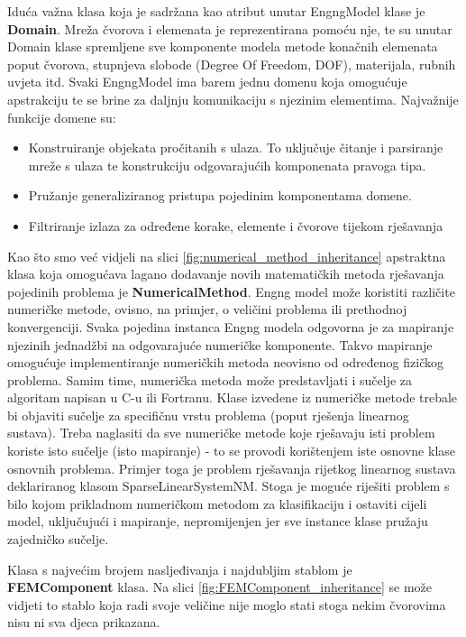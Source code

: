 \documentclass[a4paper,twoside,12pt]{memoir} %
\begin{document}
\par
Iduća važna klasa koja je sadržana kao atribut unutar EngngModel klase je \textbf{Domain}. Mreža čvorova i elemenata je reprezentirana pomoću nje, te su unutar Domain klase spremljene sve komponente modela metode konačnih elemenata poput čvorova, stupnjeva slobode (Degree Of Freedom, DOF), materijala, rubnih uvjeta itd. Svaki EngngModel ima barem jednu domenu koja omogućuje apstrakciju te se brine za daljnju komunikaciju s njezinim elementima. Najvažnije funkcije domene su:
\begin{itemize}
    \label{text:domain}
    \item Konstruiranje objekata pročitanih s ulaza. To uključuje čitanje i parsiranje mreže s ulaza te konstrukciju odgovarajućih komponenata pravoga tipa.
    \item Pružanje generaliziranog pristupa pojedinim komponentama domene.
    \item Filtriranje izlaza za određene korake, elemente i čvorove tijekom rješavanja
\end{itemize}

\par

Kao što smo već vidjeli na slici \ref{fig:numerical_method_inheritance} apstraktna klasa koja omogućava lagano dodavanje novih matematičkih metoda rješavanja pojedinih problema je \textbf{NumericalMethod}. Engng model može koristiti različite numeričke metode, ovisno, na primjer, o veličini problema ili prethodnoj konvergenciji. Svaka pojedina instanca Engng modela odgovorna je za mapiranje njezinih jednadžbi na odgovarajuće numeričke komponente. Takvo mapiranje omogućuje implementiranje numeričkih metoda neovisno od određenog fizičkog problema. Samim time, numerička metoda može predstavljati i sučelje za algoritam napisan u C-u ili Fortranu. Klase izvedene iz numeričke metode trebale bi objaviti sučelje za specifičnu vrstu problema (poput rješenja linearnog sustava). Treba naglasiti da sve numeričke metode koje rješavaju isti problem koriste isto sučelje (isto mapiranje) - to se provodi korištenjem iste osnovne klase osnovnih problema. Primjer toga je problem rješavanja rijetkog linearnog sustava deklariranog klasom SparseLinearSystemNM. Stoga je moguće riješiti problem s bilo kojom prikladnom numeričkom metodom za klasifikaciju i ostaviti cijeli model, uključujući i mapiranje, nepromijenjen jer sve instance klase pružaju zajedničko sučelje. \par

Klasa s najvećim brojem nasljeđivanja i najdubljim stablom je \textbf{FEMComponent} klasa. Na slici \ref{fig:FEMComponent_inheritance} se može vidjeti to stablo koja radi svoje veličine nije moglo stati stoga nekim čvorovima nisu ni sva djeca prikazana.
\end{document}
